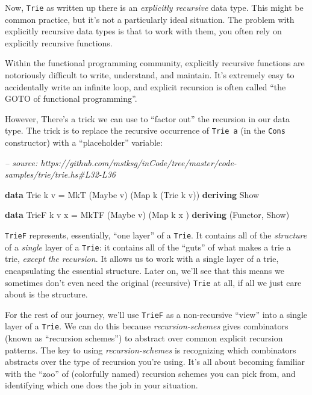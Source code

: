 \documentclass[]{article}
\newenvironment{Shaded}{}{}
\newcommand{\CommentTok}[1]{\textcolor[rgb]{0.38,0.63,0.69}{\textit{#1}}}
\newcommand{\DataTypeTok}[1]{\textcolor[rgb]{0.56,0.13,0.00}{#1}}
\newcommand{\FunctionTok}[1]{\textcolor[rgb]{0.02,0.16,0.49}{#1}}
\newcommand{\KeywordTok}[1]{\textcolor[rgb]{0.00,0.44,0.13}{\textbf{#1}}}
\newcommand{\NormalTok}[1]{#1}
\begin{document}
Now, \texttt{Trie} as written up there is an \emph{explicitly recursive} data
type. This might be common practice, but it's not a particularly ideal
situation. The problem with explicitly recursive data types is that to work with
them, you often rely on explicitly recursive functions.

Within the functional programming community, explicitly recursive functions are
notoriously difficult to write, understand, and maintain. It's extremely easy to
accidentally write an infinite loop, and explicit recursion is often called
``the GOTO of functional programming''.

However, There's a trick we can use to ``factor out'' the recursion in our data
type. The trick is to replace the recursive occurrence of \texttt{Trie\ a} (in
the \texttt{Cons} constructor) with a ``placeholder'' variable:

\begin{Shaded}
\begin{Highlighting}[]
\CommentTok{-- source: https://github.com/mstksg/inCode/tree/master/code-samples/trie/trie.hs#L32-L36}

\KeywordTok{data} \DataTypeTok{Trie}\NormalTok{  k v   }\FunctionTok{=} \DataTypeTok{MkT}\NormalTok{  (}\DataTypeTok{Maybe}\NormalTok{ v) (}\DataTypeTok{Map}\NormalTok{ k (}\DataTypeTok{Trie}\NormalTok{ k v))}
  \KeywordTok{deriving} \DataTypeTok{Show}

\KeywordTok{data} \DataTypeTok{TrieF}\NormalTok{ k v x }\FunctionTok{=} \DataTypeTok{MkTF}\NormalTok{ (}\DataTypeTok{Maybe}\NormalTok{ v) (}\DataTypeTok{Map}\NormalTok{ k x         )}
  \KeywordTok{deriving}\NormalTok{ (}\DataTypeTok{Functor}\NormalTok{, }\DataTypeTok{Show}\NormalTok{)}
\end{Highlighting}
\end{Shaded}

\texttt{TrieF} represents, essentially, ``one layer'' of a \texttt{Trie}. It
contains all of the \emph{structure} of a \emph{single} layer of a
\texttt{Trie}: it contains all of the ``guts'' of what makes a trie a trie,
\emph{except the recursion}. It allows us to work with a single layer of a trie,
encapsulating the essential structure. Later on, we'll see that this means we
sometimes don't even need the original (recursive) \texttt{Trie} at all, if all
we just care about is the structure.

For the rest of our journey, we'll use \texttt{TrieF} as a non-recursive
``view'' into a single layer of a \texttt{Trie}. We can do this because
\emph{recursion-schemes} gives combinators (known as ``recursion schemes'') to
abstract over common explicit recursion patterns. The key to using
\emph{recursion-schemes} is recognizing which combinators abstracts over the
type of recursion you're using. It's all about becoming familiar with the
``zoo'' of (colorfully named) recursion schemes you can pick from, and
identifying which one does the job in your situation.
\end{document}
